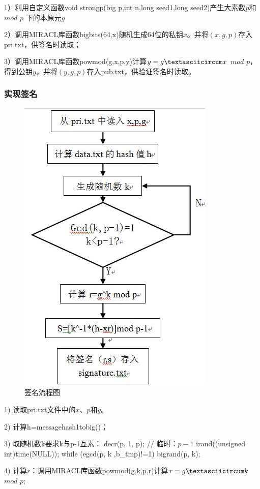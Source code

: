 1）利用自定义函数void strongp(big p,int n,long seed1,long seed2)产生大素数$p$和$mod$ $p$ 下的本原元$g$

2）调用MIRACL库函数bigbits(64,x)随机生成64位的私钥$x$。并将$(x,g,p)$存入pri.txt，供签名时读取；

3）调用MIRACL库函数powmod(g,x,p,y)计算$y=g\textasciicircum x$ $mod$ $p$，得到公钥$y$，并将$(y,g,p)$存入pub.txt，供验证签名时读取。

\subsubsection{实现签名}

\begin{figure}[H]
  \centering
  \includegraphics{img/3.jpg}
  \caption{签名流程图}
\end{figure}

1)  读取pri.txt文件中的$x$、$p$和$g$。

2)  计算h=messagehash1tobig()；

3)  取随机数k要求k与p-1互素：
  decr(p, 1, p);                        // 临时：$p - 1$
  irand((unsigned int)time(NULL));
  while (egcd(p, k ,b\_tmp)!=1)
  {
    bigrand(p, k);
  }

4)  计算$r$：调用MIRACL库函数powmod(g,k,p,r)计算$r=g\textasciicircum k$ $mod$ $p$;

